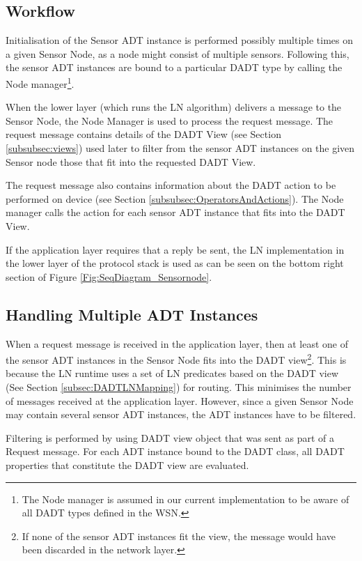 \subsection{Workflow}

Initialisation of the Sensor ADT instance is performed possibly
multiple times on a given Sensor Node, as a node might consist of multiple sensors. Following
this, the sensor ADT instances are bound to a particular DADT type by calling
the Node manager\footnote{The Node manager is assumed in our
current implementation to be aware of all DADT types defined in the WSN.}.

When the lower layer (which runs the LN algorithm) delivers a message to the
Sensor Node, the Node Manager is used to process the request message. The
request message contains details of the DADT View (see Section
\ref{subsubsec:views}) used later to filter from the sensor ADT
instances on the given Sensor node those that fit into the requested DADT View. 

The request message also contains information about the DADT action to be
performed on device (see Section \ref{subsubsec:OperatorsAndActions}). 
The Node manager calls the action for each sensor ADT instance that fits into the DADT View. 

If the application layer requires that a reply be sent, the LN implementation in
the lower layer of the protocol stack is used as can be seen on the bottom
right section of Figure \ref{Fig:SeqDiagram_Sensornode}.

\subsection{Handling Multiple ADT Instances}

When a request message is received in the application layer, then at least
one of the sensor ADT instances in the Sensor Node fits into the DADT view\footnote{If none of the sensor ADT instances fit the view, the message would have been discarded in the network
layer.}. This is because the LN runtime uses a set of LN predicates based on the
DADT view (See Section \ref{subsec:DADTLNMapping}) for routing. 
This minimises the number of messages received at the application layer. However,
since a given Sensor Node may contain several sensor ADT instances, the ADT
instances have to be filtered.

Filtering is performed by using DADT view object that was sent as part
of a Request message. For each ADT instance bound to the DADT class, all DADT
properties that constitute the DADT view are evaluated. 

